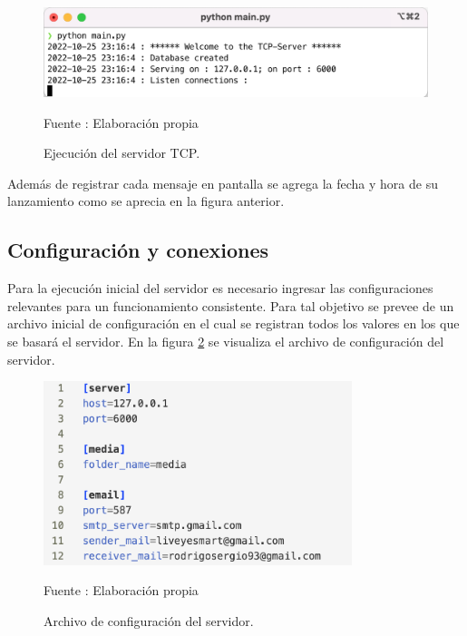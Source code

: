 \begin{figure}[H]
    \begin{center}
        \includegraphics[width=12cm]{img/capitulo_5/tcp_server.png}
    \end{center}
    \begin{center}
        \caption{Ejecución del servidor TCP.}
        Fuente : Elaboración propia
        \label{fig:servertcp_console}
    \end{center}
\end{figure}
Además de registrar cada mensaje en pantalla se agrega la fecha y hora de su lanzamiento como se aprecia en la figura anterior.
\subsection{Configuración y conexiones}
Para la ejecución inicial del servidor es necesario ingresar las configuraciones relevantes para un funcionamiento consistente. Para tal objetivo se prevee de un archivo inicial de configuración en el cual se registran todos los valores en los que se basará el servidor. En la figura \ref{fig:config_file} se visualiza el archivo de configuración del servidor.

\begin{figure}[H]
    \begin{center}
        \includegraphics[width=9cm]{img/capitulo_5/config.ini.png}
    \end{center}
    \begin{center}
        \caption{Archivo de configuración del servidor.}
        Fuente : Elaboración propia
        \label{fig:config_file}
    \end{center}
\end{figure}

